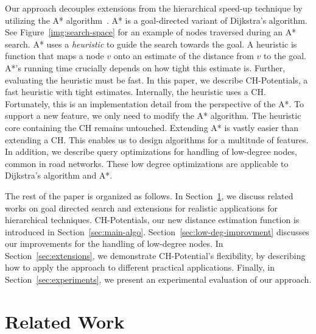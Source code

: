 \documentclass[a4paper,UKenglish,cleveref, autoref, thm-restate]{lipics-v2021}
\begin{document}
Our approach decouples extensions from the hierarchical speed-up technique by utilizing the A* algorithm~\cite{hnr-afbhd-68}.
A* is a goal-directed variant of Dijkstra's algorithm.
See Figure~\ref{img:search-space} for an example of nodes traversed during an A* search.
A* uses a \emph{heuristic} to guide the search towards the goal.
A heuristic is function that maps a node $v$ onto an estimate of the distance from $v$ to the goal.
A*'s running time crucially depends on how tight this estimate is.
Further, evaluating the heuristic must be fast.
In this paper, we describe CH-Potentials, a fast heuristic with tight estimates.
Internally, the heuristic uses a CH.
Fortunately, this is an implementation detail from the perspective of the A*.
To support a new feature, we only need to modify the A* algorithm.
The heuristic core containing the CH remains untouched.
Extending A* is vastly easier than extending a CH.
This enables us to design algorithms for a multitude of features.
In addition, we describe query optimizations for handling of low-degree nodes, common in road networks.
These low degree optimizations are applicable to Dijkstra's algorithm and A*.

The rest of the paper is organized as follows.
In Section~\ref{sec:related_work}, we discuss related works on goal directed search and extensions for realistic applications for hierarchical techniques.
CH-Potentials, our new distance estimation function is introduced in Section~\ref{sec:main-algo}.
Section~\ref{sec:low-deg-improvment} discusses our improvements for the handling of low-degree nodes.
In Section~\ref{sec:extensions}, we demonstrate CH-Potential's flexibility, by describing how to apply the approach to different practical applications.
Finally, in Section~\ref{sec:experiments}, we present an experimental evaluation of our approach.

\section{Related Work}\label{sec:related_work}
\end{document}
